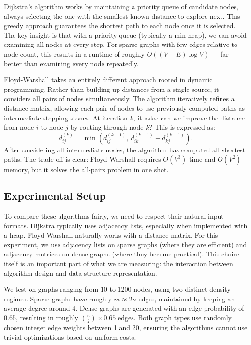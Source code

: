 \documentclass{labreport}
\begin{document}
Dijkstra's algorithm works by maintaining a priority queue of candidate nodes, always selecting the one with the smallest known distance to explore next. This greedy approach guarantees the shortest path to each node once it is selected. The key insight is that with a priority queue (typically a min-heap), we can avoid examining all nodes at every step. For sparse graphs with few edges relative to node count, this results in a runtime of roughly $O((V + E) \log V)$ — far better than examining every node repeatedly.

Floyd-Warshall takes an entirely different approach rooted in dynamic programming. Rather than building up distances from a single source, it considers all pairs of nodes simultaneously. The algorithm iteratively refines a distance matrix, allowing each pair of nodes to use previously computed paths as intermediate stepping stones. At iteration $k$, it asks: can we improve the distance from node $i$ to node $j$ by routing through node $k$? This is expressed as:
\[
    d_{ij}^{(k)} = \min\left(d_{ij}^{(k-1)},\ d_{ik}^{(k-1)} + d_{kj}^{(k-1)}\right).
\]
After considering all intermediate nodes, the algorithm has computed all shortest paths. The trade-off is clear: Floyd-Warshall requires $O(V^3)$ time and $O(V^2)$ memory, but it solves the all-pairs problem in one shot.

\subsection{Experimental Setup}

To compare these algorithms fairly, we need to respect their natural input formats. Dijkstra typically uses adjacency lists, especially when implemented with a heap. Floyd-Warshall naturally works with a distance matrix. For this experiment, we use adjacency lists on sparse graphs (where they are efficient) and adjacency matrices on dense graphs (where they become practical). This choice itself is an important part of what we are measuring: the interaction between algorithm design and data structure representation.

We test on graphs ranging from 10 to 1200 nodes, using two distinct density regimes. Sparse graphs have roughly $m \approx 2n$ edges, maintained by keeping an average degree around 4. Dense graphs are generated with an edge probability of 0.65, resulting in roughly $\binom{n}{2} \times 0.65$ edges. Both graph types use randomly chosen integer edge weights between 1 and 20, ensuring the algorithms cannot use trivial optimizations based on uniform costs.
\end{document}
